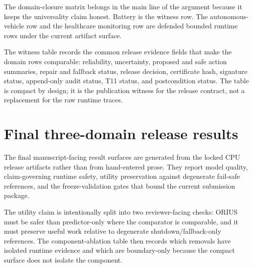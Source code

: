 The domain-closure matrix belongs in the main line of the argument because it keeps the
universality claim honest. Battery is the witness row. The autonomous-vehicle row and the
healthcare monitoring row are defended bounded runtime rows under the current artifact
surface.


The witness table records the common release evidence fields that make the
domain rows comparable: reliability, uncertainty, proposed and safe action
summaries, repair and fallback status, release decision, certificate hash,
signature status, append-only audit status, T11 status, and postcondition
status.  The table is compact by design; it is the publication witness for the
release contract, not a replacement for the raw runtime traces.

\section{Final three-domain release results}
The final manuscript-facing result surfaces are generated from the locked CPU
release artifacts rather than from hand-entered prose.  They report model
quality, claim-governing runtime safety, utility preservation against degenerate
fail-safe references, and the freeze-validation gates that bound the current
submission package.




The utility claim is intentionally split into two reviewer-facing checks: ORIUS
must be safer than predictor-only where the comparator is comparable, and it
must preserve useful work relative to degenerate shutdown/fallback-only
references.  The component-ablation table then records which removals have
isolated runtime evidence and which are boundary-only because the compact
surface does not isolate the component.


